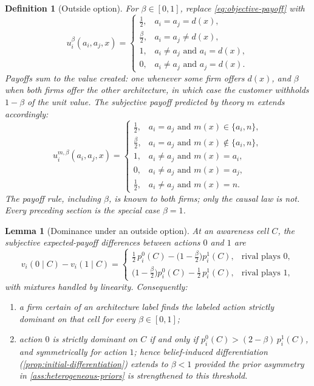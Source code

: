 \documentclass[11pt]{article}
\newtheorem{definition}[assumption]{Definition}
\newtheorem{lemma}[assumption]{Lemma}
\begin{document}
\begin{definition}[Outside option]
\label{def:outside-option}
For $\beta\in[0,1]$, replace \cref{eq:objective-payoff} with
\begin{equation}
u_i^\beta(a_i,a_j,x)=
\begin{cases}
\frac12, & a_i=a_j=d(x),\\[2pt]
\frac{\beta}{2}, & a_i=a_j\neq d(x),\\[2pt]
1, & a_i\neq a_j\text{ and }a_i=d(x),\\[2pt]
0, & a_i\neq a_j\text{ and }a_j=d(x).
\end{cases}
\label{eq:beta-payoff}
\end{equation}
Payoffs sum to the value created: one whenever some firm offers $d(x)$, and
$\beta$ when both firms offer the other architecture, in which case the
customer withholds $1-\beta$ of the unit value.  The subjective payoff
predicted by theory $m$ extends accordingly:
\begin{equation}
u_i^{m,\beta}(a_i,a_j,x)=
\begin{cases}
\frac12, & a_i=a_j\text{ and }m(x)\in\{a_i,n\},\\[2pt]
\frac{\beta}{2}, & a_i=a_j\text{ and }m(x)\notin\{a_i,n\},\\[2pt]
1, & a_i\neq a_j\text{ and }m(x)=a_i,\\[2pt]
0, & a_i\neq a_j\text{ and }m(x)=a_j,\\[2pt]
\frac12, & a_i\neq a_j\text{ and }m(x)=n.
\end{cases}
\label{eq:beta-subjective}
\end{equation}
The payoff rule, including $\beta$, is known to both firms; only the causal
law is not.  Every preceding section is the special case $\beta=1$.
\end{definition}

\begin{lemma}[Dominance under an outside option]
\label{lem:beta-dominance}
At an awareness cell $C$, the subjective expected-payoff differences between
actions $0$ and $1$ are
\[
v_i(0\mid C)-v_i(1\mid C)
=
\begin{cases}
\tfrac12\,p_i^0(C)-\bigl(1-\tfrac{\beta}{2}\bigr)p_i^1(C),
& \text{rival plays }0,\\[4pt]
\bigl(1-\tfrac{\beta}{2}\bigr)p_i^0(C)-\tfrac12\,p_i^1(C),
& \text{rival plays }1,
\end{cases}
\]
with mixtures handled by linearity.  Consequently:
\begin{enumerate}[label=(\roman*)]
  \item a firm certain of an architecture label finds the labeled action
  strictly dominant on that cell for every $\beta\in[0,1]$;
  \item action $0$ is strictly dominant on $C$ if and only if
  $p_i^0(C)>(2-\beta)\,p_i^1(C)$, and symmetrically for action $1$; hence
  belief-induced differentiation (\cref{prop:initial-differentiation}) extends
  to $\beta<1$ provided the prior asymmetry in
  \cref{ass:heterogeneous-priors} is strengthened to this threshold.
\end{enumerate}
\end{lemma}
\end{document}
